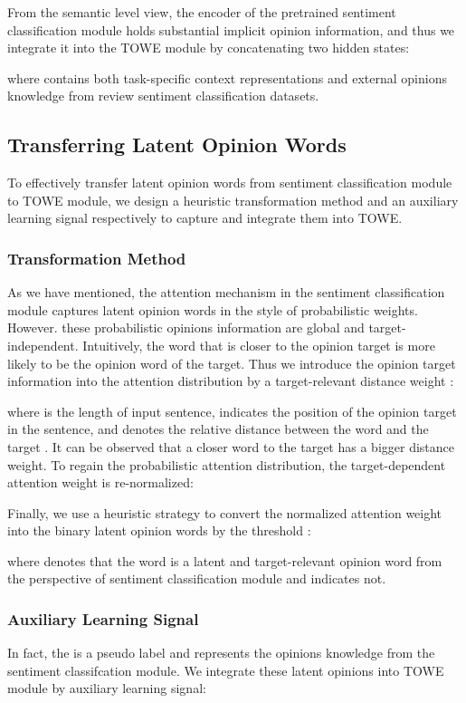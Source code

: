 \documentclass[letterpaper]{article} \usepackage{aaai20}  \usepackage{times}  \usepackage{helvet} \usepackage{courier}  \usepackage[hyphens]{url}  \usepackage{graphicx} \urlstyle{rm} \def\UrlFont{\rm}  \usepackage{graphicx}
\begin{document}
From the semantic level view, the encoder of the pretrained sentiment classification module holds substantial implicit opinion information, and thus we integrate it into the TOWE module by concatenating two hidden states:


where  contains both task-specific context representations and external opinions knowledge from review sentiment classification datasets.

\subsection{Transferring  Latent Opinion Words}
To effectively transfer latent opinion words from sentiment classification module to TOWE module, we design a heuristic transformation method and an auxiliary learning signal respectively to capture and integrate them into TOWE.
\subsubsection{Transformation Method}
As we have mentioned, the attention mechanism in the sentiment classification module captures latent opinion words in the style of probabilistic weights. However. these probabilistic opinions information are global and target-independent. Intuitively, the word that is closer to the opinion target is more likely to be the opinion word of the target. Thus we introduce the opinion target information into the attention distribution by a target-relevant distance weight :

where  is the length of input sentence,  indicates the position of the opinion target  in the sentence, and  denotes the relative distance between the word  and the target . It can be observed that a closer word to the target has a bigger distance weight. To regain the probabilistic attention distribution, the target-dependent attention weight  is re-normalized:


Finally, we use a heuristic strategy to convert the normalized attention weight  into the binary latent opinion words by the threshold :

where  denotes that the word  is a latent and target-relevant opinion word from the perspective of sentiment classification module and  indicates not.

\subsubsection{Auxiliary Learning Signal}
In fact, the  is a pseudo label and represents the opinions knowledge from the sentiment classifcation module. We integrate these latent opinions into TOWE module by auxiliary learning signal:
\end{document}
